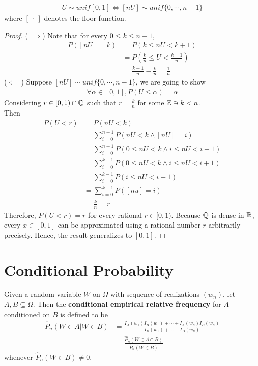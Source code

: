 \documentclass{article}
\begin{document}
   	\begin{theorem}[An Application]
   		\begin{align}
   			U \sim unif[0, 1] \iff [nU] \sim unif\{0, \cdots, n-1\}
   		\end{align}
   		where $[\ \cdot\ ]$ denotes the floor function.
   	\end{theorem}
   	
   	\begin{proof}
   		($\implies$) Note that for every $0 \leq k \leq n-1$,
   		\begin{align}
   			P([nU] = k) &= P(k \leq nU < k + 1) \\
   			&= P(\frac{k}{n} \leq U < \frac{k+1}{n}) \\
   			&= \frac{k+1}{n} - \frac{k}{n} = \frac{1}{n}
   		\end{align}
   		($\impliedby$)
   		Suppose $[nU] \sim unif\{0, \cdots, n-1\}$, we are going to show
   		\begin{align}
   			\forall \alpha \in [0, 1], P(U \leq \alpha) = \alpha
   		\end{align}
   		Considering $r \in [0, 1) \cap \mathbb{Q}$ such that $r = \frac{k}{n}$ for some $\mathbb{Z} \ni k < n$.\\
   		Then
   		\begin{align}
   			P(U < r) &= P(nU < k) \\
   			&= \sum_{i=0}^{n-1} P(nU < k \land [nU] = i) \\
   			&= \sum_{i=0}^{n-1} P(0 \leq nU < k \land i \leq nU < i+1) \\
   			&= \sum_{i=0}^{k-1} P(0 \leq nU < k \land i \leq nU < i+1) \\
   			&= \sum_{i=0}^{k-1}P(i \leq nU < i + 1) \\
   			&= \sum_{i=0}^{k-1}P([nu] = i) \\
   			&= \frac{k}{n} = r
   		\end{align}
   		Therefore, $P(U < r) = r$ for every rational $r \in [0, 1)$. Because $\mathbb{Q}$ is dense in $\mathbb{R}$, every $x \in [0, 1]$ can be approximated using a rational number $r$ arbitrarily precisely. Hence, the result generalizes to $[0, 1]$.
   	\end{proof}
   	
   	\section{Conditional Probability}
   	\begin{definition}
   		Given a random variable $W$ on $\Omega$ with sequence of realizations $(w_n)$, let $A, B \subseteq \Omega$. Then the \textbf{conditional empirical relative frequency} for $A$ conditioned on $B$ is defined to be
   		\begin{align}
   			\hat{P}_{n}(W \in A | W \in B) &=\frac{I_{A}\left(w_{1}\right) I_{B}\left(w_{1}\right)+\cdots+I_{A}\left(w_{n}\right) I_{B}\left(w_{n}\right)}{I_{B}\left(w_{1}\right)+\cdots+I_{B}\left(w_{n}\right)} \\
   			&= \frac{\hat{P}_n(W \in A \cap B)}{\hat{P}_n(W \in B)}
   		\end{align}
   		whenever $\hat{P}_n(W \in B) \neq 0$.
   	\end{definition}
   	
\end{document}

